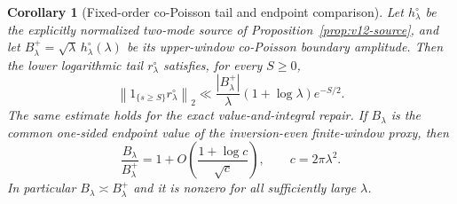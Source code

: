 \documentclass[11pt]{article}
\newtheorem{corollary}[theorem]{Corollary}
\theoremstyle{remark}
\begin{document}
\begin{corollary}[Fixed-order co-Poisson tail and endpoint comparison]\label{cor:pswf-cross-tail}
Let $h_\lambda^{\circ}$ be the explicitly normalized two-mode source of
Proposition~\ref{prop:v12-source}, and let
$B_\lambda^{+}=\sqrt\lambda\,h_\lambda^{\circ}(\lambda)$ be its upper-window co-Poisson boundary amplitude.  Then the lower logarithmic tail $r_\lambda^{\circ}$ satisfies, for every $S\ge0$,
\begin{equation}\label{eq:lower-tail-l2}
 \left\|1_{\{s\ge S\}}r_\lambda^{\circ}\right\|_2
 \ll \frac{|B_\lambda^{+}|}{\lambda}(1+\log\lambda)e^{-S/2}.
\end{equation}
The same estimate holds for the exact value-and-integral repair. If
$B_\lambda$ is the common one-sided endpoint value of the inversion-even
finite-window proxy, then
\begin{equation}\label{eq:v13-endpoint-comparison}
 \frac{B_\lambda}{B_\lambda^+}
 =1+O\!\left(\frac{1+\log c}{\sqrt c}\right),
 \qquad c=2\pi\lambda^2.
\end{equation}
In particular $B_\lambda\asymp B_\lambda^+$ and it is nonzero for all
sufficiently large $\lambda$.
\end{corollary}
\end{document}
